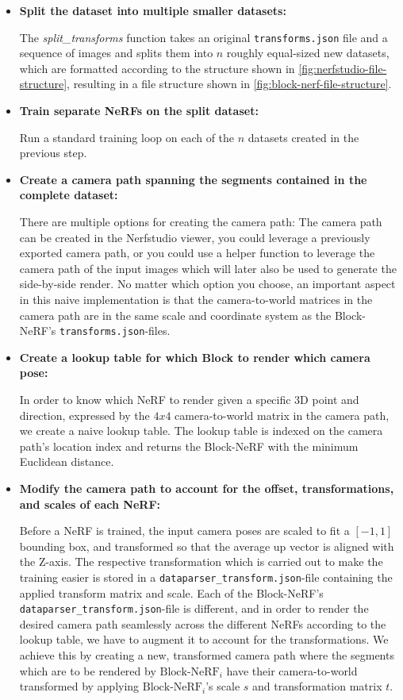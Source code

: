 \begin{itemize}
    \item \textbf{Split the dataset into multiple smaller datasets:} 

    The \textit{split\_transforms} function takes an original \texttt{transforms.json} file and a sequence of images and splits them into $n$ roughly equal-sized new datasets, which are formatted according to the structure shown in \autoref{fig:nerfstudio-file-structure}, resulting in a file structure shown in \autoref{fig:block-nerf-file-structure}.

    \item \textbf{Train separate NeRFs on the split dataset:} 

    Run a standard training loop on each of the $n$ datasets created in the previous step.
    
    \item \textbf{Create a camera path spanning the segments contained in the complete dataset:}
    
    There are multiple options for creating the camera path: The camera path can be created in the Nerfstudio viewer, you could leverage a previously exported camera path, or you could use a helper function to leverage the camera path of the input images which will later also be used to generate the side-by-side render. No matter which option you choose, an important aspect in this naive implementation is that the camera-to-world matrices in the camera path are in the same scale and coordinate system as the Block-NeRF's \texttt{transforms.json}-files.
    
    \item \textbf{Create a lookup table for which Block to render which camera pose:}

    In order to know which NeRF to render given a specific 3D point and direction, expressed by the $4x4$ camera-to-world matrix in the camera path, we create a naive lookup table. The lookup table is indexed on the camera path's location index and returns the Block-NeRF with the minimum Euclidean distance.

    \item \textbf{Modify the camera path to account for the offset, transformations, and scales of each NeRF:}
    
    Before a NeRF is trained, the input camera poses are scaled to fit a $[-1, 1]$ bounding box, and transformed so that the average up vector is aligned with the Z-axis. The respective transformation which is carried out to make the training easier is stored in a \texttt{dataparser\_transform.json}-file containing the applied transform matrix and scale. Each of the Block-NeRF's \texttt{dataparser\_transform.json}-file is different, and in order to render the desired camera path seamlessly across the different NeRFs according to the lookup table, we have to augment it to account for the transformations. We achieve this by creating a new, transformed camera path where the segments which are to be rendered by $\text{Block-NeRF}_i$ have their camera-to-world transformed by applying $\text{Block-NeRF}_i$'s scale $s$ and transformation matrix $t$. 
    

\end{itemize}
